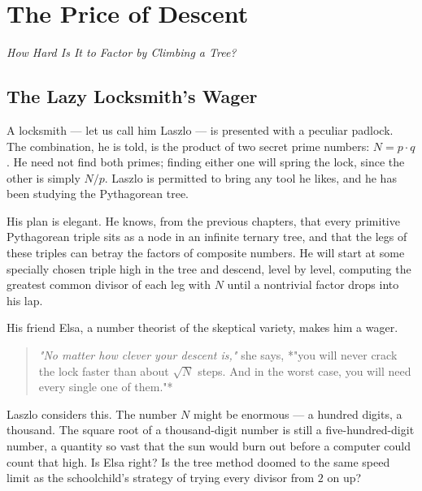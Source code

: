 \chapter{The Price of Descent}



\begin{center}\textit{How Hard Is It to Factor by Climbing a Tree?}\end{center}
\bigskip


\ornbreak



\section{The Lazy Locksmith's Wager}


A locksmith --- let us call him Laszlo --- is presented with a peculiar padlock. The combination, he is told, is the product of two secret prime numbers: $N = p \cdot q$. He need not find both primes; finding either one will spring the lock, since the other is simply $N / p$. Laszlo is permitted to bring any tool he likes, and he has been studying the Pythagorean tree.

His plan is elegant. He knows, from the previous chapters, that every primitive Pythagorean triple sits as a node in an infinite ternary tree, and that the legs of these triples can betray the factors of composite numbers. He will start at some specially chosen triple high in the tree and descend, level by level, computing the greatest common divisor of each leg with $N$ until a nontrivial factor drops into his lap.

His friend Elsa, a number theorist of the skeptical variety, makes him a wager.

\begin{quote}
\textit{"No matter how clever your descent is,"} she says, *"you will never crack the lock faster than about $\sqrt{N}$ steps. And in the worst case, you will need every single one of them."*
\end{quote}

Laszlo considers this. The number $N$ might be enormous --- a hundred digits, a thousand. The square root of a thousand-digit number is still a five-hundred-digit number, a quantity so vast that the sun would burn out before a computer could count that high. Is Elsa right? Is the tree method doomed to the same speed limit as the schoolchild's strategy of trying every divisor from $2$ on up?

